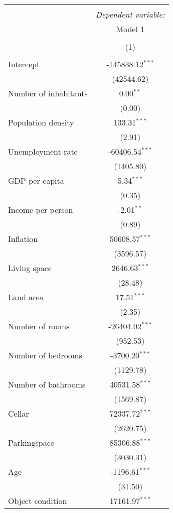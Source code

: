 \begin{table}[!htbp] \centering
\begin{tabular}{@{\extracolsep{5pt}}lc}
\\[-1.8ex]\hline
\hline \\[-1.8ex]
& \multicolumn{1}{c}{\textit{Dependent variable:}} \
\cr \cline{1-2}
\\[-1.8ex] & \multicolumn{1}{c}{Model 1} \\\\[-1.8ex] & (1) \\
\hline \\[-1.8ex]
 Intercept & -145838.12$^{***}$ \\
  & (42544.62) \\
 Number of inhabitants & 0.00$^{**}$ \\
  & (0.00) \\
 Population density & 133.31$^{***}$ \\
  & (2.91) \\
 Unemployment rate & -60406.54$^{***}$ \\
  & (1405.80) \\
 GDP per capita & 5.34$^{***}$ \\
  & (0.35) \\
 Income per person & -2.01$^{**}$ \\
  & (0.89) \\
 Inflation & 50608.57$^{***}$ \\
  & (3596.57) \\
 Living space & 2646.63$^{***}$ \\
  & (28.48) \\
 Land area & 17.51$^{***}$ \\
  & (2.35) \\
 Number of rooms & -26404.02$^{***}$ \\
  & (952.53) \\
 Number of bedrooms & -3700.20$^{***}$ \\
  & (1129.78) \\
 Number of bathrooms & 40531.58$^{***}$ \\
  & (1569.87) \\
 Cellar & 72337.72$^{***}$ \\
  & (2620.75) \\
 Parkingspace & 85306.88$^{***}$ \\
  & (3030.31) \\
 Age & -1196.61$^{***}$ \\
  & (31.50) \\
 Object condition & 17161.97$^{***}$ \\

\end{tabular}
\end{table}
